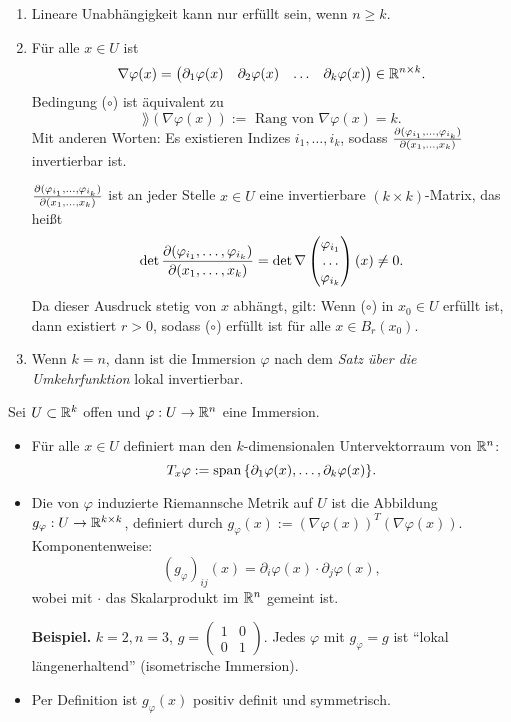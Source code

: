 \begin{rmrk}
 \begin{enumerate}
  \item Lineare Unabhängigkeit kann nur erfüllt sein, wenn $n \ge k$.
  \item Für alle $x \in U$ ist 
   \[ \nabla\varphi(x) = \begin{pmatrix} \partial_1 \varphi(x) & \partial_2 \varphi(x) & \ldots & \partial_k \varphi(x) \end{pmatrix} \in \mathbb{R}^{n \times k}.\]
   Bedingung ($\circ$) ist äquivalent zu
   \[ \rang( \nabla \varphi(x) ) := \text{ Rang von } \nabla \varphi(x) = k. \]
   Mit anderen Worten: Es existieren Indizes $i_1, \ldots, i_k$, sodass $\frac{\partial (\varphi_{i_1}, \ldots, \varphi_{i_k})}{\partial (x_1, \ldots, x_k)}$ invertierbar ist.
   
   $\frac{\partial (\varphi_{i_1}, \ldots, \varphi_{i_k})}{\partial (x_1, \ldots, x_k)}$ ist an jeder Stelle $x \in U$ eine invertierbare $(k \times k)$-Matrix, das heißt 
   \[ \det \frac{\partial (\varphi_{i_1}, \ldots, \varphi_{i_k})}{\partial (x_1, \ldots, x_k)} = \det \nabla \begin{pmatrix} \varphi_{i_1} \\ \ldots \\ \varphi_{i_k} \end{pmatrix}(x) \ne 0. \]
   Da dieser Ausdruck stetig von $x$ abhängt, gilt: Wenn ($\circ$) in $x_0 \in U$ erfüllt ist, dann existiert $r > 0$, sodass ($\circ$) erfüllt ist für alle $x \in B_r(x_0)$.
  \item Wenn $k=n$, dann ist die Immersion $\varphi$ nach dem \emph{Satz über die Umkehrfunktion} lokal invertierbar.
 \end{enumerate}
\end{rmrk}

\begin{defn}
 Sei $U \subset \mathbb{R}^k$ offen und $\varphi: U \to \mathbb{R}^n$ eine Immersion.
 \begin{itemize}
  \item Für alle $x \in U$ definiert man den $k$-dimensionalen Untervektorraum von $\mathbb{R}^n$:
  \[ T_x \varphi := \mathrm{span}\, \{ \partial_1 \varphi(x), \ldots, \partial_k \varphi(x) \}. \]
 \item Die von $\varphi$ induzierte Riemannsche Metrik auf $U$ ist die Abbildung $g_\varphi: U \to \mathbb{R}^{k \times k}$, definiert durch $g_\varphi(x) := (\nabla \varphi(x))^T (\nabla \varphi(x))$. Komponentenweise:
  \[ (g_\varphi)_{ij}(x) = \partial_i \varphi(x) \cdot \partial_j \varphi(x), \]
  wobei mit $\cdot$ das Skalarprodukt im $\mathbb{R}^n$ gemeint ist.
 
  \textbf{Beispiel.} $k=2, n=3$, $g = \begin{pmatrix} 1 & 0 \\ 0 & 1 \end{pmatrix}$. Jedes $\varphi$ mit $g_\varphi = g$ ist ``lokal längenerhaltend'' (isometrische Immersion).
 \item Per Definition ist $g_\varphi(x)$ positiv definit und symmetrisch.
 \end{itemize}
\end{defn}

